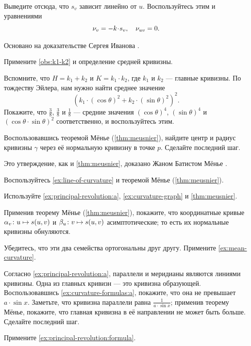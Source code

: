 \begin{multicols}{2}
Выведите отсюда, что $s_v$ зависит линейно от $u$.
Воспользуйтесь этим и уравнениями
\[\Norm_v=-k\cdot s_v,\quad \Norm_{uv}=0.\]

Основано на доказательстве Сергея Иванова \cite[3-й сем. Лекция 13]{ivanov}.

\setcounter{eqtn}{0}

Примените \ref{obs:k1-k2} и определение средней кривизны.

Вспомните, что $H=k_1+k_2$ и $K=k_1\cdot k_2$, где $k_1$ и $k_2$ --- главные кривизны.
По тождеству Эйлера, нам нужно найти среднее значение
\[(k_1\cdot (\cos\theta)^2+k_2\cdot (\sin\theta)^2)^2.\]
Покажите, что $\tfrac38$, $\tfrac38$ и $\tfrac18$ --- средние значения $(\cos\theta)^4$, $(\sin\theta)^4$ и $(\cos\theta\cdot \sin\theta)^2$ соответственно, и воспользуйтесь этим.

Воспользовавшись теоремой Мёнье (\ref{thm:meusnier}), найдите центр и радиус кривизны $\gamma$ через её нормальную кривизну в точке $p$.
Сделайте последний шаг.

Это утверждение, как и \ref{thm:meusnier}, доказано Жаном Батистом Мёнье \cite{meusnier}.

Воспользуйтесь \ref{ex:line-of-curvature} и теоремой Мёнье (\ref{thm:meusnier}).

Используйте \ref{ex:principal-revolution:a},  \ref{ex:curvature-graph} и \ref{thm:meusnier}.

Применив теорему Мёнье (\ref{thm:meusnier}), покажите, что координатные кривые $\alpha_v\:u\z\mapsto s(u,v)$ и $\beta_u\:v\z\mapsto s(u,v)$ асимптотические; то есть их нормальные кривизны обнуляются.

Убедитесь, что эти два семейства ортогональны друг другу.
Примените \ref{ex:mean-curvature}.

Согласно \ref{ex:principal-revolution:a}, параллели и меридианы являются линиями кривизны.
Одна из главных кривизн --- это кривизна образующей.
Воспользовавшись \ref{ex:curvature-formulas:a}, покажите, что она не превышает $a\cdot \sin x$.
Заметьте, что кривизна параллели равна $\tfrac1{a\cdot \sin x}$;
применив теорему Мёнье, покажите, что главная кривизна в её направлении не может быть больше.
Сделайте последний шаг.

Примените \ref{ex:principal-revolution:formula}.


\end{multicols}
